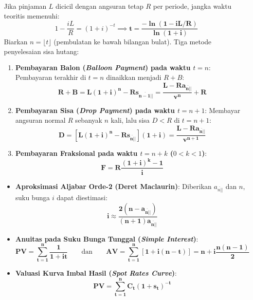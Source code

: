 \documentclass[10pt,a4paper]{article}
\newcommand{\angl}[1]{\overline{#1|}}
\begin{document}
\begin{jebakanbox}
Jika pinjaman $L$ dicicil dengan angsuran tetap $R$ per periode, jangka waktu teoritis memenuhi:
\begin{equation*}
    1 - \frac{iL}{R} = (1+i)^{-t} \implies \mathbf{t = \frac{-\ln(1 - iL/R)}{\ln(1+i)}}
\end{equation*}
Biarkan $n = \lfloor t \rfloor$ (pembulatan ke bawah bilangan bulat). Tiga metode penyelesaian sisa hutang:
\begin{enumerate}[leftmargin=1.5em, topsep=1.5pt, itemsep=2pt]
    \item \textbf{Pembayaran Balon (\textit{Balloon Payment}) pada waktu $t = n$}:
    Pembayaran terakhir di $t=n$ dinaikkan menjadi $R + B$:
    \begin{equation*}
        \mathbf{R + B = L(1+i)^n - R s_{\angl{n-1}|} = \frac{L - R a_{\angl{n}|}}{v^n} + R}
    \end{equation*}
    \item \textbf{Pembayaran Sisa (\textit{Drop Payment}) pada waktu $t = n+1$}:
    Membayar angsuran normal $R$ sebanyak $n$ kali, lalu sisa $D < R$ di $t=n+1$:
    \begin{equation*}
        \mathbf{D = \left[ L(1+i)^n - R s_{\angl{n}|} \right](1+i) = \frac{L - R a_{\angl{n}|}}{v^{n+1}}}
    \end{equation*}
    \item \textbf{Pembayaran Fraksional pada waktu $t = n+k$ ($0 < k < 1$)}:
    \begin{equation*}
        \mathbf{F = R \frac{(1+i)^k - 1}{i}}
    \end{equation*}
\end{enumerate}
\end{jebakanbox}

\begin{rumusbox}
\begin{itemize}[leftmargin=1.5em, topsep=1.5pt, itemsep=2pt]
    \item \textbf{Aproksimasi Aljabar Orde-2 (Deret Maclaurin)}: Diberikan $a_{\angl{n}|}$ dan $n$, suku bunga $i$ dapat diestimasi:
    \begin{equation*}
        \mathbf{i \approx \frac{2(n - a_{\angl{n}|})}{(n+1) a_{\angl{n}|}}}
    \end{equation*}
    \item \textbf{Anuitas pada Suku Bunga Tunggal (\textit{Simple Interest})}:
    \begin{equation*}
        \mathbf{PV = \sum_{t=1}^n \frac{1}{1 + it}} \qquad\text{dan}\qquad \mathbf{AV = \sum_{t=1}^n \left[ 1 + i(n-t) \right] = n + i \frac{n(n-1)}{2}}
    \end{equation*}
    \item \textbf{Valuasi Kurva Imbal Hasil (\textit{Spot Rates Curve})}:
    \begin{equation*}
        \mathbf{PV = \sum_{t=1}^n C_t (1 + s_t)^{-t}}
    \end{equation*}
\end{itemize}
\end{rumusbox}
\end{document}
